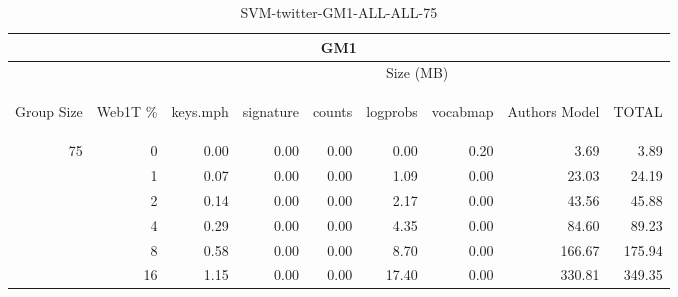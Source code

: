 \begin{center}
\begin{table}[htbp] 
 \begin{center}
\begin{tabular}{ | r | r | r | r | r | r | r | r | r |}
\hline
\multicolumn{9}{|c|}{GM1}\\
\hline
 & & \multicolumn{7}{|c|}{Size (MB)}\\ \cline{3-9}
\begin{sideways}Group Size\end{sideways} & \begin{sideways}Web1T \% \end{sideways} & \begin{sideways}keys.mph\end{sideways} & \begin{sideways}signature\end{sideways} & \begin{sideways}counts\end{sideways} & \begin{sideways}logprobs\end{sideways} & \begin{sideways}vocabmap\end{sideways} & \begin{sideways}Authors Model \end{sideways} & \begin{sideways}TOTAL\end{sideways}\\
\hline
\multirow{5}{*}{75}
 & 0 & 0.00 & 0.00 & 0.00 & 0.00 & 0.20 & 3.69 & 3.89\\ \cline{2-9}
 & 1 & 0.07 & 0.00 & 0.00 & 1.09 & 0.00 & 23.03 & 24.19\\ \cline{2-9}
 & 2 & 0.14 & 0.00 & 0.00 & 2.17 & 0.00 & 43.56 & 45.88\\ \cline{2-9}
 & 4 & 0.29 & 0.00 & 0.00 & 4.35 & 0.00 & 84.60 & 89.23\\ \cline{2-9}
 & 8 & 0.58 & 0.00 & 0.00 & 8.70 & 0.00 & 166.67 & 175.94\\ \cline{2-9}
 & 16 & 1.15 & 0.00 & 0.00 & 17.40 & 0.00 & 330.81 & 349.35\\ \cline{2-9}
\hline
\end{tabular}
\caption{SVM-twitter-GM1-ALL-ALL-75}
\label{table:SVM-twitter-GM1-ALL-ALL-75}
\end{center}
 \end{table}
\end{center}

